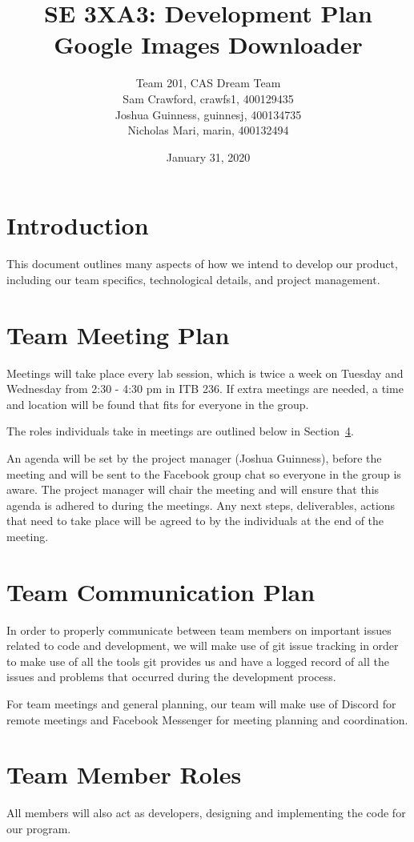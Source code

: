 \documentclass{article}
\title{SE 3XA3: Development Plan\\Google Images Downloader}
\author{Team 201, CAS Dream Team
		\\ Sam Crawford, crawfs1, 400129435
		\\ Joshua Guinness, guinnesj, 400134735
		\\ Nicholas Mari, marin, 400132494
}
\date{January 31, 2020}
\begin{document}
\maketitle

\tableofcontents

\newpage

\section{Introduction}
This document outlines many aspects of how we intend to develop our product, 
including our team specifics, technological details, and project management.

\section{Team Meeting Plan}
Meetings will take place every lab session, which is twice a week on Tuesday and 
Wednesday from 2:30 - 4:30 pm in ITB 236. If extra meetings are needed, a time 
and location will be found that fits for everyone in the group.

The roles individuals take in meetings are outlined below in Section~\ref{roles}. 

An agenda will be set by the project manager (Joshua Guinness), before the 
meeting and will be sent to the Facebook group chat so everyone in the group is 
aware. The project manager will chair the meeting and will ensure that this 
agenda is adhered to during the meetings. Any next steps, deliverables, actions 
that need to take place will be agreed to by the individuals at the end of the meeting. 

\section{Team Communication Plan}
In order to properly communicate between team members on important issues 
related to code and development, we will make use of git issue tracking in order 
to make use of all the tools git provides us and have a logged record of all the 
issues and problems that occurred during the development process.

For team meetings and general planning, our team will make use of Discord for 
remote meetings and Facebook Messenger for meeting planning and coordination.

\section{Team Member Roles}
\label{roles}
All members will also act as developers, designing and implementing the code for 
our program.
\end{document}
